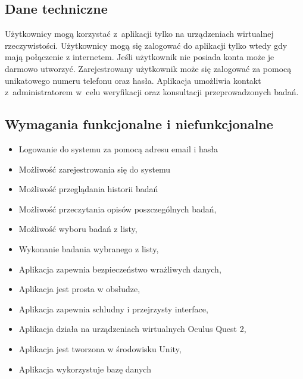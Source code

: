 \documentclass[12pt, letterpaper]{article}
\begin{document}
	\subsection{Dane techniczne}
	
	Użytkownicy mogą korzystać z~aplikacji tylko na urządzeniach wirtualnej rzeczywistości. Użytkownicy mogą się zalogować do aplikacji tylko wtedy gdy mają połączenie z internetem. Jeśli użytkownik nie posiada konta może je darmowo utworzyć. Zarejestrowany użytkownik może się zalogować za pomocą unikatowego numeru telefonu oraz hasła. Aplikacja umożliwia kontakt z~administratorem w~celu weryfikacji oraz konsultacji przeprowadzonych badań.
	

	\newpage	
	
	\subsection{Wymagania funkcjonalne i niefunkcjonalne}

		
			\begin{itemize}
				\item Logowanie do systemu za pomocą adresu email i hasła
				\item Możliwość zarejestrowania się do systemu
				\item Możliwość przeglądania historii badań
				\item Możliwość przeczytania opisów poszczególnych badań,
				\item Możliwość wyboru badań z listy,
				\item Wykonanie badania wybranego z listy,
			\end{itemize}
			
		
			\begin{itemize}
				\item Aplikacja zapewnia bezpieczeństwo wrażliwych danych,
				\item Aplikacja jest prosta w obsłudze,
				\item Aplikacja zapewnia schludny i przejrzysty interface,
				\item Aplikacja działa na urządzeniach wirtualnych Oculus Quest 2,
				\item Aplikacja jest tworzona w środowisku Unity,
				\item Aplikacja wykorzystuje bazę danych
			\end{itemize}
			
\end{document}
